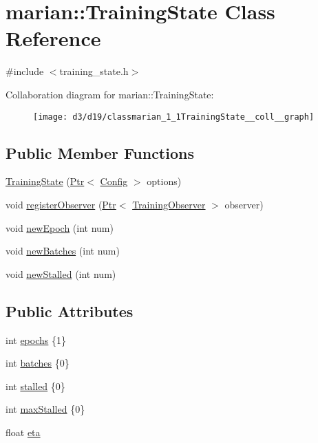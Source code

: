 \hypertarget{classmarian_1_1TrainingState}{}\section{marian\+:\+:Training\+State Class Reference}
\label{classmarian_1_1TrainingState}


{\ttfamily \#include $<$training\+\_\+state.\+h$>$}



Collaboration diagram for marian\+:\+:Training\+State\+:
\nopagebreak
\begin{figure}[H]
\begin{center}
\leavevmode
\texttt{[image: d3/d19/classmarian\_1\_1TrainingState\_\_coll\_\_graph]}
\end{center}
\end{figure}
\subsection*{Public Member Functions}
\begin{DoxyCompactItemize}
\item 
\hyperlink{classmarian_1_1TrainingState_a779eb7a4b5a0d5f014ac097cf63d5160}{Training\+State} (\hyperlink{namespacemarian_ad1a373be43a00ef9ce35666145137b08}{Ptr}$<$ \hyperlink{classmarian_1_1Config}{Config} $>$ options)
\item 
void \hyperlink{classmarian_1_1TrainingState_a6babf2034b20e5287a7eab8db27195c8}{register\+Observer} (\hyperlink{namespacemarian_ad1a373be43a00ef9ce35666145137b08}{Ptr}$<$ \hyperlink{classmarian_1_1TrainingObserver}{Training\+Observer} $>$ observer)
\item 
void \hyperlink{classmarian_1_1TrainingState_a2bb562c6092063a3135d3320ae8c3590}{new\+Epoch} (int num)
\item 
void \hyperlink{classmarian_1_1TrainingState_a7ffdee69043609288065ab193112abfb}{new\+Batches} (int num)
\item 
void \hyperlink{classmarian_1_1TrainingState_aab523ccb0a9285fb6f713d293befcbdd}{new\+Stalled} (int num)
\end{DoxyCompactItemize}
\subsection*{Public Attributes}
\begin{DoxyCompactItemize}
\item 
int \hyperlink{classmarian_1_1TrainingState_af5401310c2dc5aa0dad01d36efd0d508}{epochs} \{1\}
\item 
int \hyperlink{classmarian_1_1TrainingState_ab2d469b72278e47d92a82cd6b24f93c7}{batches} \{0\}
\item 
int \hyperlink{classmarian_1_1TrainingState_a8e007320f3eb4860aa19af20ce18c13d}{stalled} \{0\}
\item 
int \hyperlink{classmarian_1_1TrainingState_a7ff30779aa3ac9b66118a64211cab7fd}{max\+Stalled} \{0\}
\item 
float \hyperlink{classmarian_1_1TrainingState_ae8adecdd9040fc08d1fe0dfdc27aabbe}{eta}
\end{DoxyCompactItemize}
